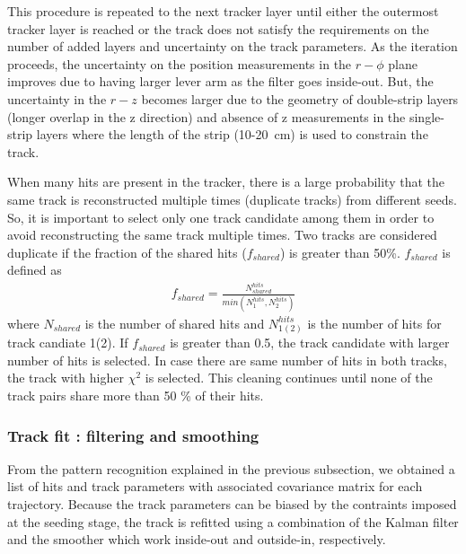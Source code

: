 This procedure is repeated to the next tracker layer until either the 
outermost tracker layer is reached or the track does not satisfy the requirements
on the number of added layers and uncertainty on the track parameters.
As the iteration proceeds, the uncertainty on the position measurements 
in the $r-\phi$ plane improves due to having larger lever arm 
as the filter goes inside-out. But, the uncertainty in the $r-z$ 
becomes larger due to the geometry of double-strip layers
(longer overlap in the z direction) and absence of z measurements 
in the single-strip layers where the length of the strip (10-20~cm) is 
used to constrain the track. 


When many hits are present in the tracker, 
there is a large probability that the same track is reconstructed 
multiple times (duplicate tracks) from different seeds. 
So, it is important to select only one track candidate among them 
in order to avoid reconstructing the same track multiple times. 
Two tracks are considered duplicate if the fraction of the shared hits 
($f_{shared}$) is greater than 50\%.  $f_{shared}$ is defined as 
\begin{eqnarray} 
f_{shared} = \frac{N_{shared}^{hits}}{min (N_1^{hits}, N_2^{hits}) }  
\end{eqnarray}  
where $N_{shared}$ is the number of shared hits and $N_{1(2)}^{hits}$ 
is the number of hits for track candiate 1(2). If $f_{shared}$ is 
greater than 0.5, the track candidate with larger number of hits is selected. 
In case there are same number of hits in both tracks, the track with higher $\chi^2$
is selected. This cleaning continues until none of the track pairs share more than 
50 \% of their hits.  


\subsubsection{Track fit : filtering and smoothing}

From the pattern recognition explained in the previous subsection, 
we obtained a list of hits and track parameters 
with associated covariance matrix for each trajectory. 
Because the track parameters can be biased 
by the contraints imposed at the seeding stage, the track is refitted 
using a combination of the Kalman filter and the smoother
which work inside-out and outside-in, respectively. 

